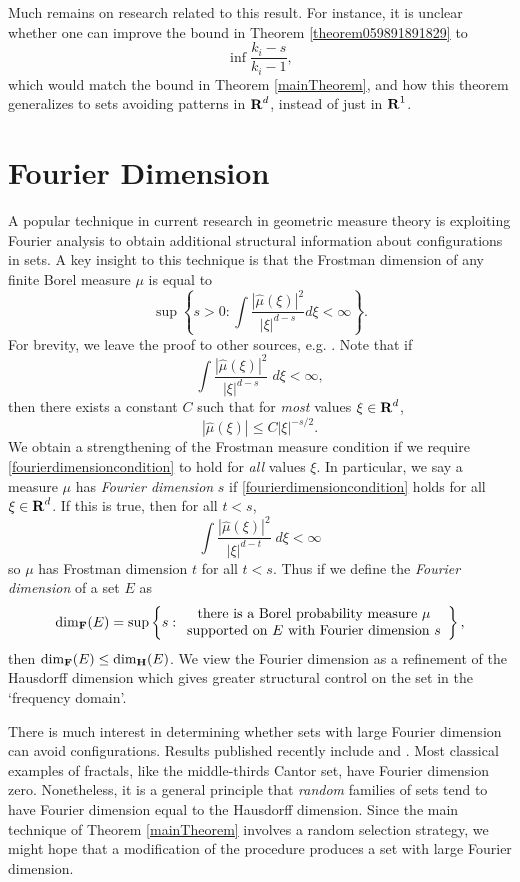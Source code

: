 Much remains on research related to this result. For instance, it is unclear whether one can improve the bound in Theorem \ref{theorem059891891829} to
%
\[ \inf \frac{k_i - s}{k_i - 1}, \]
%
which would match the bound in Theorem \ref{mainTheorem}, and how this theorem generalizes to sets avoiding patterns in $\operatorname{\mathbf{R}}^d$, instead of just in $\operatorname{\mathbf{R}}^1$.

\section{Fourier Dimension}

A popular technique in current research in geometric measure theory is exploiting Fourier analysis to obtain additional structural information about configurations in sets. A key insight to this technique is that the Frostman dimension of any finite Borel measure $\mu$ is equal to
%
\[ \sup \left\{ s > 0 : \int \frac{|\widehat{\mu}(\xi)|^2}{|\xi|^{d-s}} d\xi < \infty \right\}. \]
%
For brevity, we leave the proof to other sources, e.g. \cite[Section 3.5]{Matilla}. Note that if
%
\[ \int \frac{|\widehat{\mu}(\xi)|^2}{|\xi|^{d-s}}\; d\xi < \infty, \]
%
then there exists a constant $C$ such that for \emph{most} values $\xi \in \operatorname{\mathbf{R}}^d$,
%
\begin{equation} \label{fourierdimensioncondition}
    |\widehat{\mu}(\xi)| \leq C |\xi|^{-s/2}.
\end{equation}
%
We obtain a strengthening of the Frostman measure condition if we require \eqref{fourierdimensioncondition} to hold for \emph{all} values $\xi$. In particular, we say a measure $\mu$ has \emph{Fourier dimension} $s$ if \eqref{fourierdimensioncondition} holds for all $\xi \in \operatorname{\mathbf{R}}^d$. If this is true, then for all $t < s$,
%
\[ \int \frac{|\widehat{\mu}(\xi)|^2}{|\xi|^{d-t}}\; d\xi < \infty \]
%
so $\mu$ has Frostman dimension $t$ for all $t < s$. Thus if we define the \emph{Fourier dimension} of a set $E$ as
%
\[ \operatorname{\dim_{\mathbf{F}}}(E) = \sup \left\{ s : \begin{array}{c} \text{there is a Borel probability measure $\mu$}\\ \text{supported on $E$ with Fourier dimension $s$} \end{array} \right\}, \]
%
then $\operatorname{\dim_{\mathbf{F}}}(E) \leq \operatorname{\dim_{\mathbf{H}}}(E)$. We view the Fourier dimension as a refinement of the Hausdorff dimension which gives greater structural control on the set in the `frequency domain'.

There is much interest in determining whether sets with large Fourier dimension can avoid configurations. Results published recently include \cite{PramanikLaba} and \cite{Shmerkin}. Most classical examples of fractals, like the middle-thirds Cantor set, have Fourier dimension zero. Nonetheless, it is a general principle that \emph{random} families of sets tend to have Fourier dimension equal to the Hausdorff dimension. Since the main technique of Theorem \ref{mainTheorem} involves a random selection strategy, we might hope that a modification of the procedure produces a set with large Fourier dimension.

